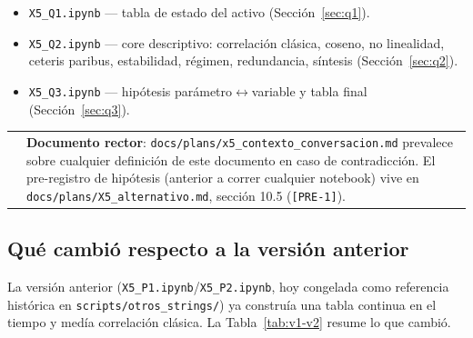 \documentclass[11pt,a4paper]{article}
\makeatletter
\newcommand{\code}[1]{\texttt{\small #1}}
\newenvironment{nota}{%
  \par\medskip\noindent
  \begin{tabular}{@{}p{0.4em}@{\hspace{8pt}}p{\dimexpr\linewidth-2em\relax}@{}}
  \textcolor{cnaranja}{\rule{3pt}{1.1em}} &
}{\end{tabular}\par\medskip}
\makeatother
\begin{document}
\begin{itemize}[leftmargin=1.4em,itemsep=2pt]
\item \code{X5\_Q1.ipynb} — tabla de estado del activo (Sección~\ref{sec:q1}).
\item \code{X5\_Q2.ipynb} — core descriptivo: correlación clásica, coseno, no linealidad,
  ceteris paribus, estabilidad, régimen, redundancia, síntesis (Sección~\ref{sec:q2}).
\item \code{X5\_Q3.ipynb} — hipótesis parámetro$\leftrightarrow$variable y tabla final
  (Sección~\ref{sec:q3}).
\end{itemize}

\begin{nota}
\textbf{Documento rector}: \code{docs/plans/x5\_contexto\_conversacion.md} prevalece sobre
cualquier definición de este documento en caso de contradicción. El pre-registro de
hipótesis (anterior a correr cualquier notebook) vive en
\code{docs/plans/X5\_alternativo.md}, sección 10.5 (\code{[PRE-1]}).
\end{nota}

\subsection{Qué cambió respecto a la versión anterior}

La versión anterior (\code{X5\_P1.ipynb}/\code{X5\_P2.ipynb}, hoy congelada como referencia
histórica en \code{scripts/otros\_strings/}) ya construía una tabla continua en el tiempo y
medía correlación clásica. La Tabla~\ref{tab:v1-v2} resume lo que cambió.
\end{document}
